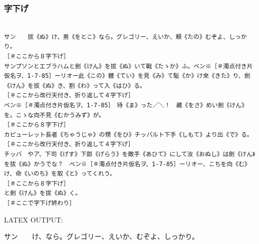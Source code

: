 \documentclass[a4paper,tate]{jlreq}
\begin{document}
\subsubsection*{字下げ}
\footnotesize
\linespread{1.0}
\begin{verbatim}

サン　　拔《ぬ》け、男《をとこ》なら。グレゴリー、えいか、頼《たの》むぞよ、しっかり。
［＃ここから８字下げ］
サンプソンとエブラハムと劍《けん》を拔《ぬ》いて戰《たゝか》ふ。ベン※［＃濁点付き片仮名ヲ、1-7-85］ーリオー此《この》體《てい》を見《み》て駈《か》け來《きた》り、劍《けん》を拔《ぬ》き、割《わ》って入《はひ》る。
［＃ここから改行天付き、折り返して４字下げ］
ベン※［＃濁点付き片仮名ヲ、1-7-85］　待《ま》った／＼！　藏《をさ》めい劍《けん》を。こゝな向不見《むかうみず》が。
［＃ここから８字下げ］
カピューレット長者《ちゃうじゃ》の甥《をひ》チッバルト下手《しもて》より出《で》る。
［＃ここから改行天付き、折り返して４字下げ］
チッバ　やア、下司《げす》下郎《げらう》を敵手《あひて》にして汝《おぬし》は劍《けん》を拔《ぬ》かうでな？　ベン※［＃濁点付き片仮名ヲ、1-7-85］ーリオー、こちを向《む》け、命《いのち》を取《と》ってくれう。
［＃ここから８字下げ］
と劍《けん》を拔《ぬ》く。
［＃ここで字下げ終わり］

\end{verbatim}
\linespread{1.4}
\normalsize
LATEX OUTPUT:
\zw


サン　　け、なら。グレゴリー、えいか、むぞよ、しっかり。
\end{document}
